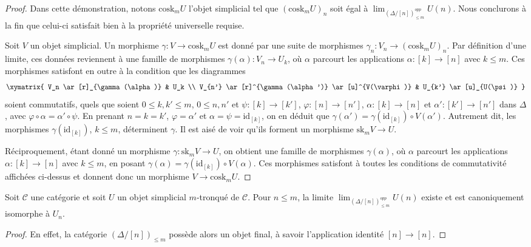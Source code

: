 \begin{proof}
Dans cette démonstration, notons $\text{cosk}_mU$ l'objet simplicial tel
que $(\text{cosk}_mU)_n$ soit égal à
$\lim_{(\Delta/[n])_{\leq m}^{opp}} U(n)$. Nous conclurons à la fin que
celui-ci satisfait bien à la propriété universelle requise.

\medskip\noindent
Soit $V$ un objet simplicial. Un morphisme
$\gamma : V \to \text{cosk}_mU$ est donné par une suite de morphismes
$\gamma_n : V_n \to (\text{cosk}_mU)_n$. Par définition d'une limite,
ces données reviennent à une famille de morphismes
$\gamma(\alpha) : V_n \to U_k$, où $\alpha$ parcourt les applications
$\alpha : [k] \to [n]$ avec $k \leq m$. Ces morphismes satisfont en outre
à la condition que les diagrammes
$$
\xymatrix{
V_n \ar[r]_{\gamma(\alpha)} &  U_k \\
V_{n'} \ar[r]^{\gamma(\alpha')} \ar[u]^{V(\varphi)} & U_{k'} \ar[u]_{U(\psi)}
}
$$
soient commutatifs, quels que soient $0 \leq k, k' \leq m$,
$0 \leq n, n'$ et $\psi : [k] \to [k']$,
$\varphi : [n] \to [n']$, $\alpha : [k] \to [n]$ et
$\alpha' : [k'] \to [n']$ dans $\Delta$, avec
$\varphi \circ \alpha = \alpha' \circ \psi$. En prenant
$n = k = k'$, $\varphi = \alpha'$ et
$\alpha = \psi = \text{id}_{[k]}$, on en déduit que
$\gamma(\alpha') = \gamma(\text{id}_{[k]}) \circ V(\alpha')$.
Autrement dit, les morphismes $\gamma(\text{id}_{[k]})$, $k \leq m$,
déterminent $\gamma$. Il est aisé de voir qu'ils forment un morphisme
$\text{sk}_m V \to U$.

\medskip\noindent
Réciproquement, étant donné un morphisme
$\gamma : \text{sk}_m V \to U$, on obtient une famille de morphismes
$\gamma(\alpha)$, où $\alpha$ parcourt les applications
$\alpha : [k] \to [n]$ avec $k \leq m$, en posant
$\gamma(\alpha) = \gamma(\text{id}_{[k]}) \circ V(\alpha)$.
Ces morphismes satisfont à toutes les conditions de commutativité
affichées ci-dessus et donnent donc un morphisme
$V \to \text{cosk}_m U$.
\end{proof}

\begin{lemma}
\label{lemma-trivial-cosk}
Soit $\mathcal{C}$ une catégorie et soit $U$ un objet simplicial
$m$-tronqué de $\mathcal{C}$. Pour $n \leq m$, la limite
$\lim_{(\Delta/[n])_{\leq m}^{opp}} U(n)$ existe et est canoniquement
isomorphe à $U_n$.
\end{lemma}

\begin{proof}
En effet, la catégorie $(\Delta/[n])_{\leq m}$ possède alors un objet
final, à savoir l'application identité $[n] \to [n]$.
\end{proof}

